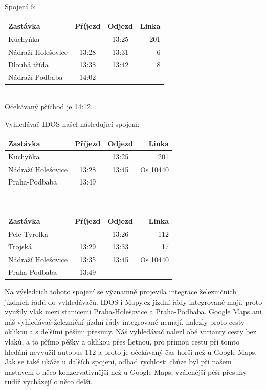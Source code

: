 Spojení 6:\\[2mm]
\begin{tabular}{|l|c|c|r|}\hline
{\bf Zastávka}&{\bf Příjezd}&{\bf Odjezd}&{\bf Linka}\\\hline
Kuchyňka&&13:25&201\\\hline
Nádraží Holešovice&13:28&13:31&6\\\hline
Dlouhá třída&13:38&13:42&8\\\hline
Nádraží Podbaba&14:02&&\\\hline
\end{tabular}\\[2mm]
Očekávaný příchod je 14:12. 


Vyhledávač IDOS našel následující spojení:\\
\begin{tabular}{|l|c|c|r|}\hline
{\bf Zastávka}&{\bf Příjezd}&{\bf Odjezd}&{\bf Linka}\\\hline
Kuchyňka&&13:25&201\\\hline
Nádraží Holešovice&13:28&13:45&Os 10440\\\hline
Praha-Podbaba&13:49&&\\\hline
\end{tabular}\\
\begin{tabular}{|l|c|c|r|}\hline
{\bf Zastávka}&{\bf Příjezd}&{\bf Odjezd}&{\bf Linka}\\\hline
Pelc Tyrolka&&13:26&112\\\hline
Trojská&13:29&13:33&17\\\hline
Nádraží Holešovice&13:35&13:45&Os 10440\\\hline
Praha-Podbaba&13:49&&\\\hline
\end{tabular} 

Na výsledcích tohoto spojení se významně projevila integrace železničních
jízdních řádů do vyhledávačů. IDOS i Mapy.cz jízdní řády integrované mají,
proto využily vlak mezi stanicemi Praha-Holešovice a Praha-Podbaba. Google Maps
ani náš vyhledávač železniční jízdní řády integrované nemají, nalezly proto
cesty oklikou a s delšími pěšími přesuny. Náš vyhledávač nalezl obě varianty
cesty bez vlaků, a to přímo pěšky a oklikou přes Letnou, pro přímou cestu při
tomto hledání nevyužil autobus 112 a proto je očekávaný čas horší než u Google
Maps. Jak se také ukáže u dalších spojení, odhad rychlosti chůze byl při našem
nastavení o něco konzervativnější než u Google Maps, vzálenější pěší přesuny
tudíž vycházejí o něco delší.



